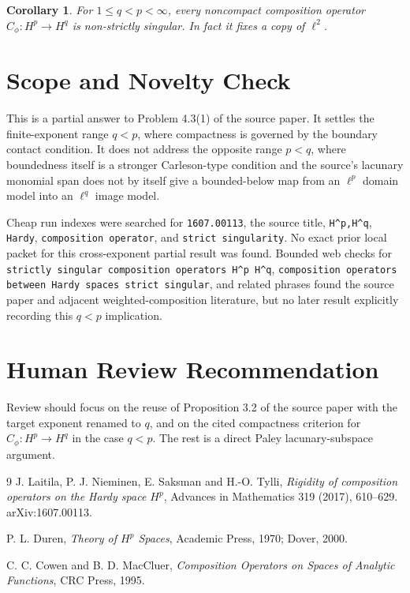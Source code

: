 \documentclass[11pt]{article}
\newtheorem{corollary}{Corollary}
\begin{document}
\begin{corollary}
For $1\le q<p<\infty$, every noncompact composition operator
$C_\phi:H^p\to H^q$ is non-strictly singular.  In fact it fixes a copy of
$\ell^2$.
\end{corollary}

\section*{Scope and Novelty Check}

This is a partial answer to Problem 4.3(1) of the source paper.  It settles
the finite-exponent range $q<p$, where compactness is governed by the boundary
contact condition.  It does not address the opposite range $p<q$, where
boundedness itself is a stronger Carleson-type condition and the source's
lacunary monomial span does not by itself give a bounded-below map from an
$\ell^p$ domain model into an $\ell^q$ image model.

Cheap run indexes were searched for \texttt{1607.00113}, the source title,
\texttt{H\^{}p,H\^{}q}, \texttt{Hardy}, \texttt{composition operator}, and
\texttt{strict singularity}.  No exact prior local packet for this
cross-exponent partial result was found.  Bounded web checks for
\texttt{strictly singular composition operators H\^{}p H\^{}q},
\texttt{composition operators between Hardy spaces strict singular}, and
related phrases found the source paper and adjacent weighted-composition
literature, but no later result explicitly recording this $q<p$ implication.

\section*{Human Review Recommendation}

Review should focus on the reuse of Proposition 3.2 of the source paper with
the target exponent renamed to $q$, and on the cited compactness criterion
for $C_\phi:H^p\to H^q$ in the case $q<p$.  The rest is a direct Paley
lacunary-subspace argument.

\begin{thebibliography}{9}
J. Laitila, P. J. Nieminen, E. Saksman and H.-O. Tylli,
\emph{Rigidity of composition operators on the Hardy space $H^p$},
Advances in Mathematics 319 (2017), 610--629.  arXiv:1607.00113.

P. L. Duren,
\emph{Theory of $H^p$ Spaces},
Academic Press, 1970; Dover, 2000.

C. C. Cowen and B. D. MacCluer,
\emph{Composition Operators on Spaces of Analytic Functions},
CRC Press, 1995.
\end{thebibliography}
\end{document}
